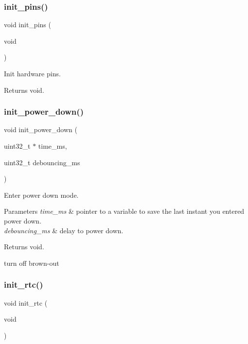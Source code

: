 \subsubsection{\texorpdfstring{init\+\_\+pins()}{init\_pins()}}
{\footnotesize\ttfamily void init\+\_\+pins (\begin{DoxyParamCaption}\item[{void}]{ }\end{DoxyParamCaption})}



Init hardware pins. 

\begin{DoxyReturn}{Returns}
void. 
\end{DoxyReturn}
\mbox{\label{i2c-th_8ino_afb98a0f07c30784284f48271ffe02b97}} 
\subsubsection{\texorpdfstring{init\+\_\+power\+\_\+down()}{init\_power\_down()}}
{\footnotesize\ttfamily void init\+\_\+power\+\_\+down (\begin{DoxyParamCaption}\item[{uint32\+\_\+t $\ast$}]{time\+\_\+ms,  }\item[{uint32\+\_\+t}]{debouncing\+\_\+ms }\end{DoxyParamCaption})}



Enter power down mode. 


\begin{DoxyParams}{Parameters}
{\em time\+\_\+ms} & pointer to a variable to save the last instant you entered power down. \\
\hline
{\em debouncing\+\_\+ms} & delay to power down. \\
\hline
\end{DoxyParams}
\begin{DoxyReturn}{Returns}
void. 
\end{DoxyReturn}
turn off brown-\/out \mbox{\label{i2c-th_8ino_ab985cc69f5f573113405b4f118c96d33}} 
\subsubsection{\texorpdfstring{init\+\_\+rtc()}{init\_rtc()}}
{\footnotesize\ttfamily void init\+\_\+rtc (\begin{DoxyParamCaption}\item[{void}]{ }\end{DoxyParamCaption})}



